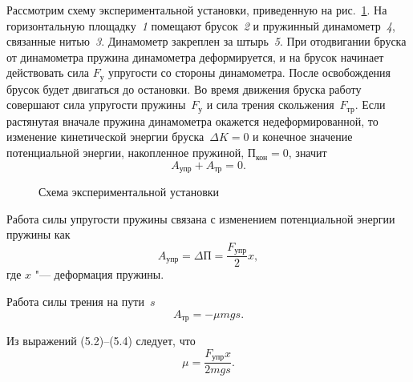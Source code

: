 \documentclass[a4paper, 12pt]{extarticle}
\begin{document}
Рассмотрим схему экспериментальной установки, приведенную на рис.~\ref{fig:m5-equipment}. На горизонтальную площадку~\emph{1} помещают брусок~\emph{2} и пружинный динамометр~\emph{4}, связанные нитью~\emph{3}. Динамометр закреплен за штырь~\emph{5}. При отодвигании бруска от динамометра пружина динамометра деформируется, и на брусок начинает действовать сила $F_\text{у}$ упругости со стороны динамометра. %
После освобождения брусок будет двигаться до остановки. Во время движения бруска работу совершают сила упругости пружины~$F_\text{у}$ и сила трения скольжения~$F_\text{тр}$. Если растянутая вначале пружина динамометра окажется недеформированной, то изменение кинетической энергии бруска~$\Delta K = 0$ и конечное значение потенциальной энергии, накопленное пружиной, $\text{П}_\text{кон} = 0$, значит %
\begin{equation}
\label{eq:m5-law-of-conservation}
A_\text{упр} + A_\text{тр} = 0.
\end{equation}

\begin{figure}[h]
\begin{center}
\end{center}
\caption{Схема экспериментальной установки \label{fig:m5-equipment}}
\end{figure}

Работа силы упругости пружины связана с изменением потенциальной энергии пружины как 
\begin{equation}
\label{eq:m5-work-of-elastic-force}
A_\text{упр} = \Delta \text{П} = \frac{F_\text{упр}}{2} x,
\end{equation}
где $x$ "--- деформация пружины. 

Работа силы трения на пути~$s$
\begin{equation}
\label{eq:m5-work-of-frictional-force}
A_\text{тр} = -\mu m g s.
\end{equation}

Из выражений (5.2)--(5.4) следует, что %
\begin{equation}
\label{eq:m5-coefficient-of-friction}
\mu = \frac{F_\text{упр} x}{2mgs}.  %
\end{equation}
\end{document}
